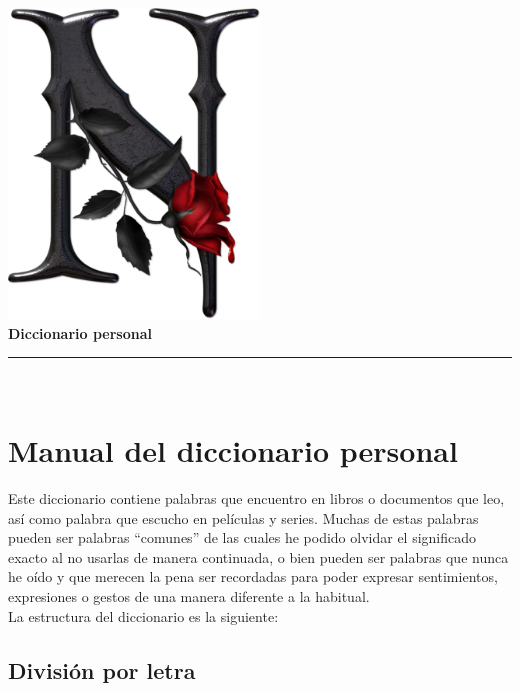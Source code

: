 \documentclass[11pt,a4paper]{article}
\begin{document}
\begin{titlepage}

\begin{minipage}{\textwidth}

\centering
\includegraphics[width=0.5\textwidth]{./portada.png}\\

{\Huge\bfseries Diccionario personal\\}
\noindent\rule[-1ex]{\textwidth}{3pt}\\[3.5ex]
\end{minipage}
\end{titlepage}

\tableofcontents
\thispagestyle{empty}

\newpage

\section{Manual del diccionario personal}

Este diccionario contiene palabras que encuentro en libros o documentos que leo, así como palabra que escucho en películas y series. Muchas de estas palabras pueden ser palabras ``comunes'' de las cuales he podido olvidar el significado exacto al no usarlas de manera continuada, o bien pueden ser palabras que nunca he oído y que merecen la pena ser recordadas para poder expresar sentimientos, expresiones o gestos de una manera diferente a la habitual.\\

La estructura del diccionario es la siguiente:

\subsection{División por letra}
\end{document}
